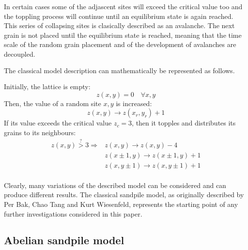 In certain cases some of the adjascent sites will exceed the critical value too and the toppling process will continue until an equilibrium state is again reached. This series of collapsing sites is clasically described as an avalanche. The next grain is not placed until the equilibrium state is reached, meaning that the time scale of the random grain placement and of the development of avalanches are decoupled.

The classical model description can mathematically be represented as follows.

Initially, the lattice is empty:
\[
z(x,y) = 0 \quad\forall x, y
\]
Then, the value of a random site $x,y$ is increased:
\[
z(x,y) \to z(x_r,y_r) + 1
\]
If its value exceeds the critical value $z_c=3$, then it topples and distributes its grains to its neighbours:
\[
\begin{aligned}
z(x,y) \overset{?}{>} 3 \Rightarrow & z(x,y) \to z(x,y)-4 \\
 & z(x\pm 1,y) \to z(x\pm 1,y)+1 \\
 & z(x,y\pm 1) \to z(x,y\pm 1)+1 \\
\end{aligned}
\]

Clearly, many variations of the described model can be considered and can produce different results. The classical sandpile model, as originally described by Per Bak, Chao Tang and Kurt Wiesenfeld, represents the starting point of any further investigations considered in this paper.

\subsection{Abelian sandpile model}


